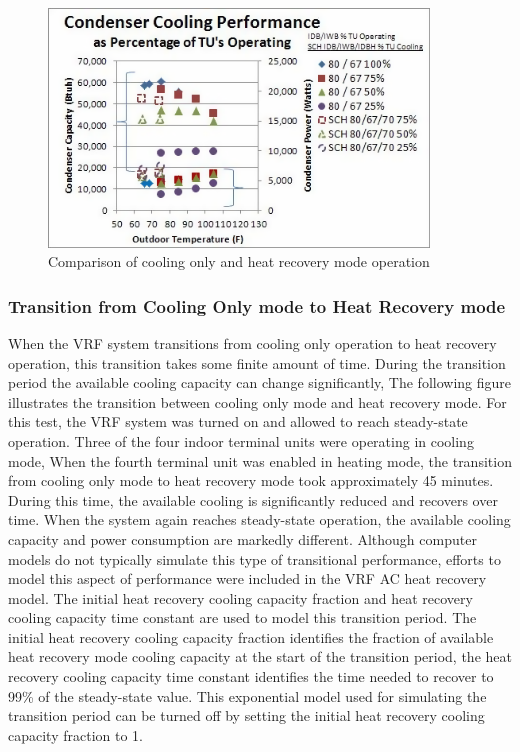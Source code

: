 \begin{figure}[hbtp] %
\centering
\includegraphics[width=0.9\textwidth, height=0.9\textheight, keepaspectratio=true]{media/image5366.png}
\caption{Comparison of cooling only and heat recovery mode operation \label{fig:comparison-of-cooling-only-and-heat-recovery-mode-operation}}
\end{figure}

\subsubsection{Transition from Cooling Only mode to Heat Recovery mode}\label{transition-from-cooling-only-mode-to-heat-recovery-mode}

When the VRF system transitions from cooling only operation to heat recovery operation, this transition takes some finite amount of time. During the transition period the available cooling capacity can change significantly, The following figure illustrates the transition between cooling only mode and heat recovery mode. For this test, the VRF system was turned on and allowed to reach steady-state operation. Three of the four indoor terminal units were operating in cooling mode, When the fourth terminal unit was enabled in heating mode, the transition from cooling only mode to heat recovery mode took approximately 45 minutes. During this time, the available cooling is significantly reduced and recovers over time. When the system again reaches steady-state operation, the available cooling capacity and power consumption are markedly different. Although computer models do not typically simulate this type of transitional performance, efforts to model this aspect of performance were included in the VRF AC heat recovery model. The initial heat recovery cooling capacity fraction and heat recovery cooling capacity time constant are used to model this transition period. The initial heat recovery cooling capacity fraction identifies the fraction of available heat recovery mode cooling capacity at the start of the transition period, the heat recovery cooling capacity time constant identifies the time needed to recover to 99\% of the steady-state value. This exponential model used for simulating the transition period can be turned off by setting the initial heat recovery cooling capacity fraction to 1.

